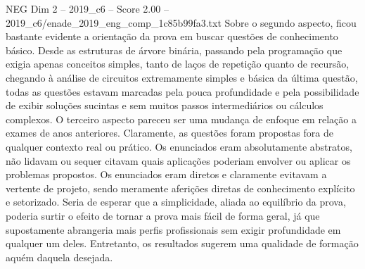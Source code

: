 \begin{textsample}{NEG Dim 2 – 2019\_c6 – Score 2.00 – 2019\_c6/enade\_2019\_eng\_comp\_1c85b99fa3.txt}
Sobre o segundo aspecto, ficou bastante evidente a orientação da prova em buscar questões de conhecimento básico.
Desde as estruturas de árvore binária, passando pela programação que exigia apenas conceitos simples, tanto de laços de repetição quanto de recursão, chegando à análise de circuitos extremamente simples e básica da última questão, todas as questões estavam marcadas pela pouca profundidade e pela possibilidade de exibir soluções sucintas e sem muitos passos intermediários ou cálculos complexos.
O terceiro aspecto pareceu ser uma mudança de enfoque em relação a exames de anos anteriores.
Claramente, as questões foram propostas fora de qualquer contexto real ou prático.
Os enunciados eram absolutamente abstratos, não lidavam ou sequer citavam quais aplicações poderiam envolver ou aplicar os problemas propostos.
Os enunciados eram diretos e claramente evitavam a vertente de projeto, sendo meramente aferições diretas de conhecimento explícito e setorizado.
Seria de esperar que a simplicidade, aliada ao equilíbrio da prova, poderia surtir o efeito de tornar a prova mais fácil de forma geral, já que supostamente abrangeria mais perfis profissionais sem exigir profundidade em qualquer um deles.
Entretanto, os resultados sugerem uma qualidade de formação aquém daquela desejada.

\end{textsample}
